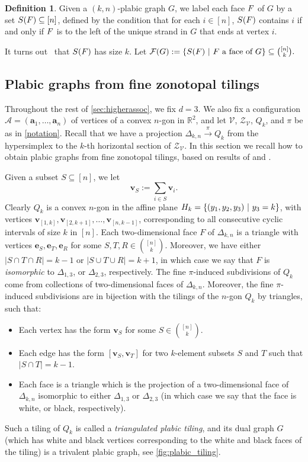 \documentclass[11pt]{amsart}
\theoremstyle{plain}
\theoremstyle{definition}
\newtheorem{definition}[theorem]{Definition}
\def\R{\mathbb{R}}
\def\v{{\bm{v}}}
\def\A{\mathcal{A}}
\def\V{\mathcal{V}}
\def\e{{\bm{e}}}
\def\a{{\bm{a}}}
\def\Zon{\mathcal{Z}}
\def\ZV{\Zon_\V}
\def\pito{\overset \pi \to}
\def\VC{\V}
\let\subset\subseteq
\begin{document}
\def\fl#1{S(#1)}
\def\FL#1{\mathcal{F}(#1)}

\begin{definition}\label{def:faces}
Given a $(k,n)$-plabic graph $G$, we label each face $F$ of $G$ by a set $\fl{\face}\subset[n]$, defined by the condition that for each $i\in[n]$, $\fl{\face}$ contains $i$ if and only if $F$ is to the left of the unique strand in $G$ that ends at vertex $i$.  
\end{definition}
\noindent It turns out~\cite{Pos06} that $\fl{\face}$ has size $k$. Let $\FL{G}:=\{\fl{\face} \ | \ \face \text{ a face of }G\} \subset {[n] \choose k}.$ 

\subsection{Plabic graphs from fine zonotopal tilings}\label{sec:plabic_graphs_from_tilings}
Throughout the rest of \cref{sec:higherassoc},
we fix $d=3$.  We also
fix a configuration $\A=(\a_1,\dots,\a_n)$ of vertices of a convex $n$-gon in $\R^2$, and 
let $\VC$, 
$\ZV$, $Q_k$, and $\pi$ be as in 
\cref{notation}. 
Recall that we have a projection 
$\Delta_{k,n}\pito Q_k$ from the 
hypersimplex to the $k$-th horizontal section of $\ZV$. 
In this section we recall how to obtain plabic graphs from fine zonotopal tilings, based on 
results of \cite{Gal} and \cite[Section 11]{PosICM}.

Given a subset $S \subset [n]$,
we let 
$$\v_S:= \sum_{i \in S} \v_i.$$
Clearly $Q_k$ is a convex $n$-gon in the affine plane $H_k = \{(y_1,y_2,y_3) \ | \ y_3=k\}$, with vertices
$\v_{[1,k]}, \v_{[2,k+1]}, \dots, \v_{[n,k-1]}$, corresponding to all consecutive cyclic intervals of size $k$ in $[n]$.
Each two-dimensional face $F$ of $\Delta_{k,n}$ is a triangle with vertices $\e_S,\e_T,\e_R$ for some $S,T,R\in{[n]\choose k}$. Moreover, we have either $|S\cap T\cap R|=k-1$ or $|S\cup T\cup R|=k+1$, in which case we say that $F$ is \emph{isomorphic} to $\Delta_{1,3}$, or $\Delta_{2,3}$, respectively. The fine $\pi$-induced subdivisions of $Q_k$ come from collections of two-dimensional faces of $\Delta_{k,n}$.   Moreover, the fine $\pi$-induced 
subdivisions are in bijection with the tilings of the $n$-gon $Q_k$ by triangles, such that:
\begin{itemize}
	\item  Each vertex has the form $\v_S$ for some $S\in {[n]\choose k}$.
	\item  Each edge has the form $[\v_S, \v_T]$ for two $k$-element subsets $S$ and $T$ such that $|S\cap T|=k-1$.
	\item  Each face is a triangle which is the projection of a two-dimensional face of $\Delta_{k,n}$ isomorphic to either 
		$\Delta_{1,3}$ or $\Delta_{2,3}$ (in which case we say that the face is white, or black, respectively).
\end{itemize}
Such a tiling of $Q_k$ is called a \emph{triangulated plabic tiling}, and its dual graph $G$ (which has white and black vertices
corresponding to the white and black faces of the tiling) is a trivalent plabic graph, 
see \cref{fig:plabic_tiling}.
\end{document}

